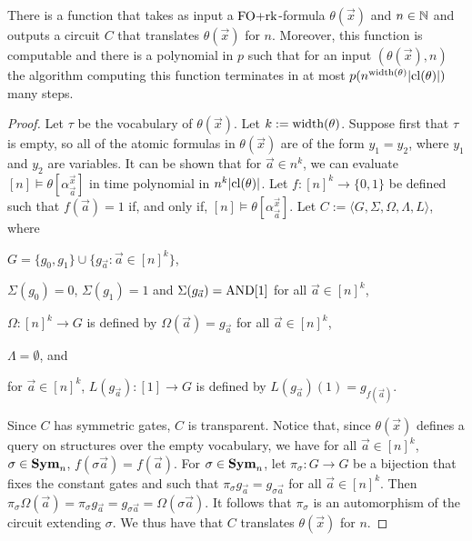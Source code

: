 \documentclass[../paper.tex]{subfiles}
\begin{document}
\begin{lem}
  There is a function that takes as input a $\text{\upshape FO+rk}$-formula $\theta(\vec{x})$
  and $n \in \mathbb{N}$ and outputs a circuit $C$ that translates $\theta(\vec{x})$
  for $n$. Moreover, this function is computable and there is a polynomial in
  $p$ such that for an input $(\theta(\vec{x}), n)$ the algorithm computing this
  function terminates in at most $p(n^{\mathrm{width}(\theta)}\vert \mathrm{cl}(\theta) \vert)$
  many steps.
  \label{lem:translating-FOrk}
\end{lem}
\begin{proof}
  Let $\tau$ be the vocabulary of $\theta(\vec{x})$. Let $k := \mathrm{width}(\theta)$.
  Suppose first that $\tau$ is empty, so all of the atomic formulas in
  $\theta(\vec{x})$ are of the form $y_1 = y_2$, where $y_1$ and $y_2$ are
  variables. It can be shown that for $\vec{a} \in n^k$, we can evaluate $[n]
  \models \theta[\alpha^{\vec{x}}_{\vec{a}}]$ in time polynomial in $n^{k} \vert
  \mathrm{cl}(\theta) \vert$. Let $f : [n]^k \rightarrow \{0,1\}$ be defined such that
  $f (\vec{a}) = 1$ if, and only if, $[n] \models
  \theta[\alpha^{\vec{x}}_{\vec{a}}]$. Let $C := \langle G, \Sigma, \Omega,
  \Lambda, L \rangle$, where
  \begin{myitemize}
  \item $G = \{g_0, g_1\} \cup \{g_{\vec{a}} : \vec{a} \in [n]^{k}\}$,
  \item $\Sigma (g_0) = 0$, $\Sigma (g_1) = 1$ and $\Sigma (g_{\vec{a}}) =
    \text{\upshape AND}[1]$ for all $\vec{a} \in [n]^k$,
  \item $\Omega : [n]^k \rightarrow G$ is defined by $\Omega(\vec{a}) =
    g_{\vec{a}}$ for all $\vec{a} \in [n]^k$,
  \item $\Lambda = \emptyset$, and
  \item for $\vec{a} \in [n]^k$, $L(g_{\vec{a}}) : [1] \rightarrow G$ is defined
    by $L(g_{\vec{a}})(1) = g_{f(\vec{a})}$.
  \end{myitemize}
  
  Since $C$ has symmetric gates, $C$ is transparent. Notice that, since
  $\theta(\vec{x})$ defines a query on structures over the empty vocabulary, we
  have for all $\vec{a} \in [n]^k$, $\sigma \in \text{\textbf{Sym}}_n$, $f(\sigma \vec{a}) =
  f(\vec{a})$. For $\sigma \in \text{\textbf{Sym}}_n$, let $\pi_\sigma : G \rightarrow G$ be a
  bijection that fixes the constant gates and such that $\pi_{\sigma}
  g_{\vec{a}} = g_{\sigma \vec{a}}$ for all $\vec{a} \in [n]^k$. Then
  $\pi_\sigma \Omega (\vec{a}) = \pi_\sigma g_{\vec{a}} = g_{\sigma \vec{a}} =
  \Omega (\sigma \vec{a})$. It follows that $\pi_\sigma$ is an automorphism of
  the circuit extending $\sigma$. We thus have that $C$ translates
  $\theta(\vec{x})$ for $n$.


\end{proof}
\end{document}
